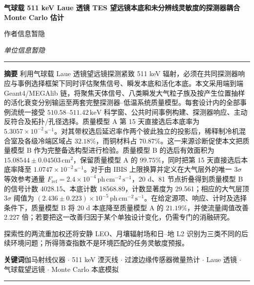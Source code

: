 \documentclass[11pt]{article}
\newcommand{\revblue}[1]{\textcolor{revisionblue}{#1}}
\newcommand{\keV}{\,\mathrm{keV}}
\newcommand{\phcms}{\,\mathrm{ph\,cm^{-2}\,s^{-1}}}
\newcommand{\cps}{\,\mathrm{s^{-1}}}
\newcommand{\fref}{F_{\mathrm{ref}}}
\begin{document}
\thispagestyle{fancy}
\begin{flushleft}
{\LARGE\bfseries 气球载 511 keV Laue 透镜 TES 望远镜本底和未分辨线灵敏度的探测器耦合 Monte Carlo 估计 \par}
\vspace{1.1em}
{\large 作者信息暂隐\par}
\vspace{0.3em}
{\normalsize\itshape 单位信息暂隐\par}
\end{flushleft}
\vspace{0.7em}
\noindent\rule{\textwidth}{0.4pt}
\vspace{0.5em}

\noindent\textbf{摘要}\hspace{0.7em}
利用气球载 Laue 透镜望远镜探测紧致 511 keV 辐射，必须在共同探测器响应与事例选择框架下同时评估聚焦信号、瞬发本底和活化本底。本文采用端到端 Geant4/MEGAlib 链，将聚焦天体信号、\revblue{八类瞬发大气粒子族}及按产生位置抽样的活化衰变分别输运至两套完整探测器--低温系统质量模型。每套设计内的全部事例流统一接受 $510.58$--$511.42\keV$ 科学窗、公共时间事例构建、探测器响应、主动反符合及拓扑/孔径选择。质量模型 A 第 15 天直接选后本底率为 $5.3057\times10^{-2}\cps$。对其带权选后延迟率作两个彼此独立的投影后，稀释制冷机混合室及各级冷端区域占 $32.18\%$，而铜材料占 $70.87\%$。这一来源诊断促使本文把质量模型 B 作为完整备选构型进行检验。质量模型 B 的选后有效面积为 $15.08544\pm0.04503\,\mathrm{cm^2}$，保留质量模型 A 的 $99.75\%$，同时把第 15 天直接选后本底率降至 $1.0747\times10^{-2}\cps$。对于由 IBIS 上限换算并定义在大气层外的唯一 $3\sigma$ 等效参考通量 $\fref=2.4\times10^{-4}\phcms$，20 d、81 节点折叠得到质量模型 B 的信号计数 4028.15、本底计数 18568.89，计数显著度为 29.561；相应的大气层顶 $3\sigma$ 阈值为 $(2.436\pm0.223)\times10^{-5}\phcms$。在给定源项、响应、计时及选择条件下，质量模型 B 将 20 d 本底降至质量模型 A 的 $21.19\%$，并使流量阈值改善 2.227 倍；若要把这一改善归因于某个单独设计变化，仍需专门的消融研究。

探索性的两流重加权还将安静 LEO、月壤辐射场和日--地 L2 识别为三类不同的后续环境问题；所得筛查指数不是环境匹配的任务灵敏度预报。

\vspace{0.7em}
\noindent\textbf{关键词}\hspace{0.7em}伽马射线仪器 $\cdot$ 511 keV 湮灭线 $\cdot$ 过渡边缘传感器微量热计 $\cdot$ Laue 透镜 $\cdot$ 气球载望远镜 $\cdot$ Monte Carlo 本底模拟

\vspace{0.3em}
\noindent\rule{\textwidth}{0.4pt}
\vspace{1.0em}
\end{document}
